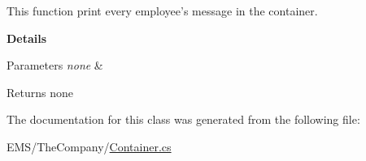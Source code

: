 This function print every employee's message in the container. 

{\bfseries Details} 
\begin{DoxyParams}{Parameters}
{\em none} & \\
\hline
\end{DoxyParams}
\begin{DoxyReturn}{Returns}
none 
\end{DoxyReturn}


The documentation for this class was generated from the following file\-:\begin{DoxyCompactItemize}
\item 
E\-M\-S/\-The\-Company/\hyperlink{_container_8cs}{Container.\-cs}\end{DoxyCompactItemize}
